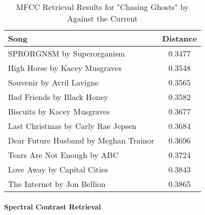 \documentclass[sigconf]{acmart}
\begin{document}
\begin{table}[ht]
    \centering
    \caption{MFCC Retrieval Results for "Chasing Ghosts" by Against the Current}
    \label{tab:mfcc_chasing_ghosts}
    \begin{tabular}{lc}
        \toprule
        \textbf{Song}                        & \textbf{Distance} \\
        \midrule
        SPRORGNSM by Superorganism            & 0.3477               \\
        High Horse by Kacey Musgraves         & 0.3548               \\
        Souvenir by Avril Lavigne             & 0.3565               \\
        Bad Friends by Black Honey             & 0.3582               \\
        Biscuits by Kacey Musgraves           & 0.3677               \\
        Last Christmas by Carly Rae Jepsen     & 0.3684               \\
        Dear Future Husband by Meghan Trainor  & 0.3696               \\
        Tears Are Not Enough by ABC            & 0.3724               \\
        Love Away by Capital Cities            & 0.3843               \\
        The Internet by Jon Bellion             & 0.3865               \\
        \bottomrule
    \end{tabular}
\end{table}

\paragraph{Spectral Contrast Retrieval}
\end{document}
